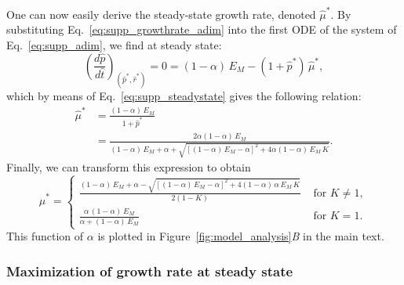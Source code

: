 One can now easily derive the steady-state growth rate, denoted $\hat{\mu}^*$.
By substituting Eq.~\ref{eq:supp_growthrate_adim} into the first ODE of the system of Eq.~\ref{eq:supp_adim}, we find at steady state:
\[
\left(\frac{d\hat{p}}{d\hat{t}}\right)_{(\hat{p}^*, \hat{r}^*)} = 0 = (1-\alpha)\, E_M - (1+\hat{p}^*)\, \hat{\mu}^*,
\]
which by means of Eq.~\ref{eq:supp_steadystate} gives the following relation:
\begin{equation}
\label{eq:supp_growthrate_p}
\begin{split}
\hat{\mu}^* &= \frac{(1-\alpha)\, E_M}{1+\hat{p}^*}\\
 &= \frac{2\alpha(1-\alpha)\, E_M}{(1-\alpha)\, E_M + \alpha + \sqrt{\left[(1-\alpha)\, E_M -\alpha\right]^2 + 4\alpha(1-\alpha)\, E_M\, K}}.
\end{split}
\end{equation}
Finally, we can transform this expression to obtain
\begin{equation}
\label{eq:supp_growthrate_final}
\hat{\mu}^* = \begin{cases}
\frac{(1-\alpha)\, E_M + \alpha - \sqrt{\left[(1-\alpha)\, E_M - \alpha\right]^2 + 4(1-\alpha)\, \alpha\, E_M\, K}}{2(1-K)} &\text{ for }K\neq 1,\\
\frac{\alpha\, (1-\alpha)\, E_M}{\alpha + (1-\alpha)\, E_M} &\text{ for }K = 1.
\end{cases}
\end{equation}
This function of $\alpha$ is plotted in Figure~\ref{fig:model_analysis}\textit{B} in the main text.

\subsubsection{Maximization of growth rate at steady state}
\label{si::optimal}

